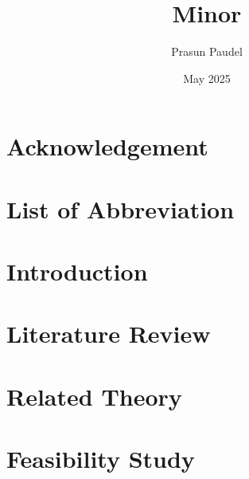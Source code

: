 \documentclass[12pt,a4paper]{report}
\title{Minor}
\author{Prasun Paudel}
\date{May 2025}
\begin{document}



\chapter*{Acknowledgement}
\label{acknowledgement}


%

\tableofcontents
\thispagestyle{empty}
\addtocounter{page}{-1}
\newpage

\listoffigures
{}
\newpage

\listoftables
{}
\newpage

\chapter*{List of Abbreviation}
\label{abbreviation}

\newpage


\chapter{Introduction}
\label{introduction}


\chapter{Literature Review}
\label{literaturereview}


\chapter{Related Theory}
\label{relatedtheory}


\chapter{Feasibility Study}
\label{feasiblity}

\end{document}
